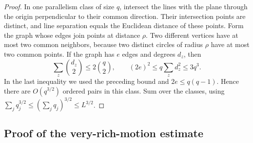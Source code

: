 \begin{proof}
In one parallelism class of size \(q\), intersect the lines with
the plane through the origin perpendicular to their common
direction.  Their intersection points are distinct, and line
separation equals the Euclidean distance of these points.
Form the graph whose edges join points at distance \(\rho\).
Two different vertices have at most two common neighbors, because
two distinct circles of radius \(\rho\) have at most two common
points.  If the graph has \(e\) edges and degrees \(d_z\), then
\[
 \sum_z\binom{d_z}{2}\le2\binom q2,
 \qquad
 (2e)^2\le q\sum_zd_z^2\le3q^3.
\]
In the last inequality we used the preceding bound and
\(2e\le q(q-1)\).  Hence there are \(O(q^{3/2})\) ordered
pairs in this class.  Sum over the classes, using
\(\sum_jq_j^{3/2}\le(\sum_jq_j)^{3/2}\le L^{3/2}\).
\end{proof}

\subsection{Proof of the very-rich-motion estimate}

